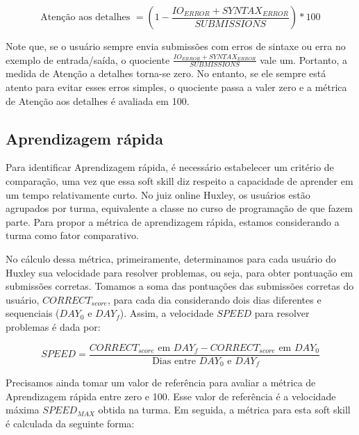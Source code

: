 \begin{equation} \label{m:atencao}
\mbox{Atenção aos detalhes } = \left(1 - \frac {IO_{ERROR} + SYNTAX_{ERROR}}{SUBMISSIONS}\right) * 100
\end{equation}

Note que, se o usuário sempre envia submissões com erros de sintaxe ou erra no exemplo de entrada/saída, o quociente 
$\frac {IO_{ERROR} + SYNTAX_{ERROR}}{SUBMISSIONS}$ vale um. Portanto, a medida de Atenção a detalhes torna-se zero.
No entanto, se ele sempre está atento para evitar esses erros simples, o quociente passa a valer zero e a métrica de Atenção aos detalhes é avaliada em 100.

\subsection{Aprendizagem rápida}

Para identificar Aprendizagem rápida, é necessário estabelecer um critério de comparação, uma vez que essa soft skill diz respeito a capacidade de aprender em um tempo relativamente curto. No juiz online Huxley, os usuários estão agrupados por turma, equivalente a classe no curso de programação de que fazem parte. Para propor a métrica de aprendizagem rápida, estamos considerando a turma como fator comparativo.

No cálculo dessa métrica, primeiramente, determinamos para cada usuário do Huxley sua velocidade para resolver problemas, ou seja, para obter pontuação em submissões corretas. Tomamos a soma das pontuações das submissões corretas do usuário, $CORRECT_{score}$, para cada dia considerando dois dias diferentes e sequenciais ($DAY_0$ e $DAY_f$). Assim, a velocidade $SPEED$ para resolver problemas é dada por:

\begin{equation} \label{m:velocidade}
SPEED = \frac {CORRECT_{score} \mbox{ em } DAY_f - CORRECT_{score} \mbox{ em } DAY_0 }
              { \mbox{ Dias entre } DAY_0 \mbox{ e } DAY_f }
\end{equation}


Precisamos ainda tomar um valor de referência para avaliar a métrica de Aprendizagem rápida entre zero e 100. Esse valor de referência é a velocidade máxima $SPEED_{MAX}$ obtida na turma. Em seguida, a métrica para esta soft skill é calculada da seguinte forma:

